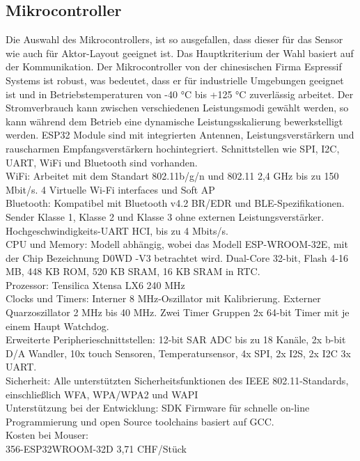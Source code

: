 \subsection{Mikrocontroller}\label{subsec: Mikrocontroller}
Die Auswahl des Mikrocontrollers, ist so ausgefallen, dass dieser für das Sensor wie auch für Aktor-Layout geeignet ist. Das Hauptkriterium der Wahl basiert auf der Kommunikation. Der Mikrocontroller von der chinesischen Firma Espressif Systems ist robust, was bedeutet, dass er für industrielle Umgebungen geeignet ist und in Betriebstemperaturen von -40 °C bis +125 °C zuverlässig arbeitet. Der Stromverbrauch kann zwischen verschiedenen Leistungsmodi gewählt werden, so kann während dem Betrieb eine dynamische Leistungsskalierung bewerkstelligt werden. ESP32 Module sind mit integrierten Antennen, Leistungsverstärkern und rauscharmen Empfangsverstärkern hochintegriert. Schnittstellen wie SPI, I2C, UART, WiFi und Bluetooth sind vorhanden.\\
WiFi:
Arbeitet mit dem Standart 802.11b/g/n und 802.11 2,4 GHz bis zu 150 Mbit/s. 4 Virtuelle Wi-Fi interfaces und Soft AP \\
Bluetooth:
Kompatibel mit Bluetooth v4.2 BR/EDR und BLE-Spezifikationen. Sender Klasse 1, Klasse 2 und Klasse 3 ohne externen Leistungsverstärker. Hochgeschwindigkeits-UART HCI, bis zu 4 Mbits/s.\\
CPU und Memory:
Modell abhängig, wobei das Modell ESP-WROOM-32E, mit der Chip Bezeichnung D0WD -V3 betrachtet wird. Dual-Core 32-bit, Flash 4-16 MB, 448 KB ROM, 520 KB SRAM, 16 KB SRAM in RTC. \\
Prozessor:
Tensilica Xtensa LX6 240 MHz\\
Clocks und Timers:
Interner 8 MHz-Oszillator mit Kalibrierung. Externer Quarzoszillator 2 MHz bis 40 MHz. Zwei Timer Gruppen 2x 64-bit Timer mit je einem Haupt Watchdog.\\
Erweiterte Peripherieschnittstellen:
12-bit SAR ADC bis zu 18 Kanäle, 2x b-bit D/A Wandler, 10x touch Sensoren, Temperatursensor, 4x SPI, 2x I2S, 2x I2C 3x UART.\\
Sicherheit:
Alle unterstützten Sicherheitsfunktionen des IEEE 802.11-Standards, einschließlich WFA, WPA/WPA2 und WAPI\\
Unterstützung bei der Entwicklung:
SDK Firmware für schnelle on-line Programmierung und open Source toolchains basiert auf GCC.\\
Kosten bei Mouser:\\
356-ESP32WROOM-32D 3,71 CHF/Stück
